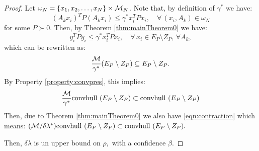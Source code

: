 \begin{proof}Let $\omega_N = \{x_1, x_2, \ldots, x_N\} \times \mathcal{M}_N$. Note that, by definition of $\gamma^*$ we have:
\begin{equation*} (A_kx_i)^TP(A_kx_i) \leq \gamma^* x_i^TPx_i, \quad \forall\, (x_i, A_k)  \in \omega_N \end{equation*}
for some $P \succ 0$. Then, by Theorem \ref{thm:mainTheorem0} we have:
\begin{equation*} y_i^TPy_i \leq \gamma^*x_i^TPx_i, \quad \forall\, x_i \in E_P \setminus Z_P,\, \forall A_k, \end{equation*}
which can be rewritten as:
\begin{equation*}\frac{\mathcal{M}}{\gamma^*}(E_P \setminus Z_P) \subseteq E_P \setminus Z_P.
\end{equation*}
By Property \ref{property:convpres}, this implies:
$$\frac{\mathcal{M}}{\gamma^*} \mbox{convhull }(E_P \setminus Z_P) \subset \mbox{convhull }(E_P \setminus Z_P)$$
Then, due to Theorem \ref{thm:mainTheorem0} we also have \eqref{eqn:contraction} which means:
$(\mathcal{M}/\delta \lambda^*) \mbox{convhull } (E_P \setminus Z_P) \subset \mbox{convhull } (E_P\setminus Z_P).$

Then, $\delta\lambda$ is un upper bound on $\rho,$ with a confidence $\beta.$ 
\end{proof}